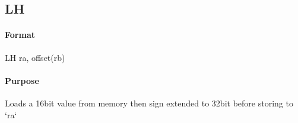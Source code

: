 \subsection{LH}


\paragraph{Format} LH ra, offset(rb)

\paragraph{Purpose} Loads a 16bit value from memory then sign extended to 32bit before storing to `ra`
